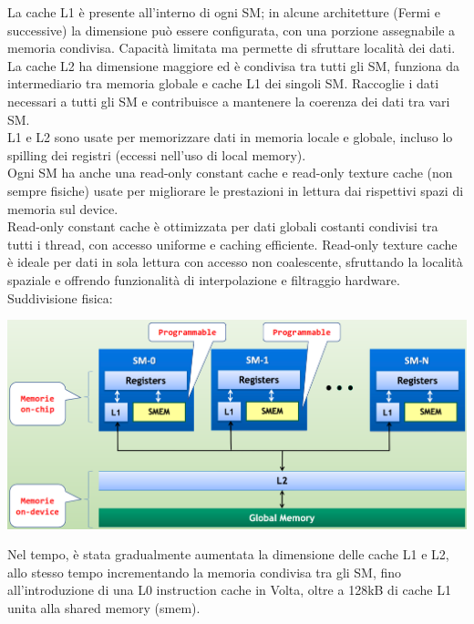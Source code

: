 La cache L1 è presente all'interno di ogni SM; in alcune architetture (Fermi e successive) la dimensione può essere configurata, con una porzione assegnabile a memoria condivisa. Capacità limitata ma permette di sfruttare località dei dati.\\
La cache L2 ha dimensione maggiore ed è condivisa tra tutti gli SM, funziona da intermediario tra memoria globale e cache L1 dei singoli SM. Raccoglie i dati necessari a tutti gli SM e contribuisce a mantenere la coerenza dei dati tra vari SM.\\

L1 e L2 sono usate per memorizzare dati in memoria locale e globale, incluso lo spilling dei registri (eccessi nell'uso di local memory). \\

Ogni SM ha anche una read-only constant cache e read-only texture cache (non sempre fisiche) usate per migliorare le prestazioni in lettura dai rispettivi spazi di memoria sul device. \\

Read-only constant cache è ottimizzata per dati globali costanti condivisi tra tutti i thread, con accesso uniforme e caching efficiente. Read-only texture cache è ideale per dati in sola lettura con accesso non coalescente, sfruttando la località spaziale e offrendo funzionalità di interpolazione e filtraggio hardware. \\

Suddivisione fisica:
\begin{center}
	\includegraphics[width=0.9\linewidth]{img/cuda/mem1}
\end{center}

Nel tempo, è stata gradualmente aumentata la dimensione delle cache L1 e L2, allo stesso tempo incrementando la memoria condivisa tra gli SM, fino all'introduzione di una L0 instruction cache in Volta, oltre a 128kB di cache L1 unita alla shared memory (smem).\\

